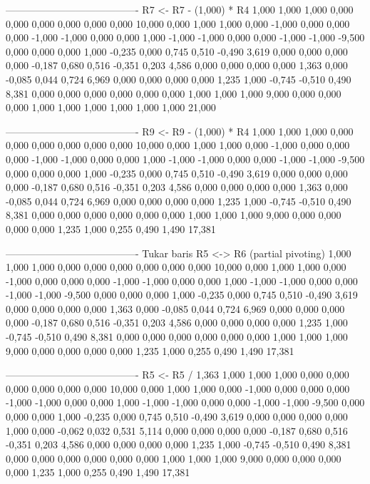 \documentclass[12pt]{article}
\begin{document}
\begin{enumerate}
\begin{keluaran}
----------------------------------------
R7 <- R7 - (1,000) * R4
1,000   1,000   1,000   0,000   0,000   0,000   0,000   0,000   0,000   10,000
0,000   1,000   1,000   0,000   -1,000  0,000   0,000   0,000   -1,000  -1,000
0,000   0,000   1,000   -1,000  -1,000  0,000   0,000   -1,000  -1,000  -9,500
0,000   0,000   0,000   1,000   -0,235  0,000   0,745   0,510   -0,490  3,619
0,000   0,000   0,000   0,000   -0,187  0,680   0,516   -0,351  0,203   4,586
0,000   0,000   0,000   0,000   1,363   0,000   -0,085  0,044   0,724   6,969
0,000   0,000   0,000   0,000   1,235   1,000   -0,745  -0,510  0,490   8,381
0,000   0,000   0,000   0,000   0,000   0,000   1,000   1,000   1,000   9,000
0,000   0,000   0,000   1,000   1,000   1,000   1,000   1,000   1,000   21,000

----------------------------------------
R9 <- R9 - (1,000) * R4
1,000   1,000   1,000   0,000   0,000   0,000   0,000   0,000   0,000   10,000
0,000   1,000   1,000   0,000   -1,000  0,000   0,000   0,000   -1,000  -1,000
0,000   0,000   1,000   -1,000  -1,000  0,000   0,000   -1,000  -1,000  -9,500
0,000   0,000   0,000   1,000   -0,235  0,000   0,745   0,510   -0,490  3,619
0,000   0,000   0,000   0,000   -0,187  0,680   0,516   -0,351  0,203   4,586
0,000   0,000   0,000   0,000   1,363   0,000   -0,085  0,044   0,724   6,969
0,000   0,000   0,000   0,000   1,235   1,000   -0,745  -0,510  0,490   8,381
0,000   0,000   0,000   0,000   0,000   0,000   1,000   1,000   1,000   9,000
0,000   0,000   0,000   0,000   1,235   1,000   0,255   0,490   1,490   17,381

----------------------------------------
Tukar baris R5 <-> R6 (partial pivoting)
1,000   1,000   1,000   0,000   0,000   0,000   0,000   0,000   0,000   10,000
0,000   1,000   1,000   0,000   -1,000  0,000   0,000   0,000   -1,000  -1,000
0,000   0,000   1,000   -1,000  -1,000  0,000   0,000   -1,000  -1,000  -9,500
0,000   0,000   0,000   1,000   -0,235  0,000   0,745   0,510   -0,490  3,619
0,000   0,000   0,000   0,000   1,363   0,000   -0,085  0,044   0,724   6,969
0,000   0,000   0,000   0,000   -0,187  0,680   0,516   -0,351  0,203   4,586
0,000   0,000   0,000   0,000   1,235   1,000   -0,745  -0,510  0,490   8,381
0,000   0,000   0,000   0,000   0,000   0,000   1,000   1,000   1,000   9,000
0,000   0,000   0,000   0,000   1,235   1,000   0,255   0,490   1,490   17,381

----------------------------------------
R5 <- R5 / 1,363
1,000   1,000   1,000   0,000   0,000   0,000   0,000   0,000   0,000   10,000
0,000   1,000   1,000   0,000   -1,000  0,000   0,000   0,000   -1,000  -1,000
0,000   0,000   1,000   -1,000  -1,000  0,000   0,000   -1,000  -1,000  -9,500
0,000   0,000   0,000   1,000   -0,235  0,000   0,745   0,510   -0,490  3,619
0,000   0,000   0,000   0,000   1,000   0,000   -0,062  0,032   0,531   5,114
0,000   0,000   0,000   0,000   -0,187  0,680   0,516   -0,351  0,203   4,586
0,000   0,000   0,000   0,000   1,235   1,000   -0,745  -0,510  0,490   8,381
0,000   0,000   0,000   0,000   0,000   0,000   1,000   1,000   1,000   9,000
0,000   0,000   0,000   0,000   1,235   1,000   0,255   0,490   1,490   17,381


\end{keluaran}
\end{enumerate}
\end{document}
